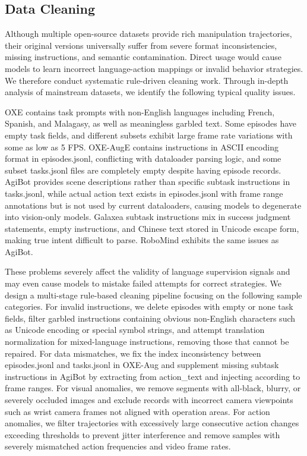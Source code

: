 \documentclass[11pt,a4paper]{article}
\begin{document}
\subsection{Data Cleaning}

Although multiple open-source datasets provide rich manipulation trajectories, their original versions universally suffer from severe format inconsistencies, missing instructions, and semantic contamination. Direct usage would cause models to learn incorrect language-action mappings or invalid behavior strategies. We therefore conduct systematic rule-driven cleaning work. Through in-depth analysis of mainstream datasets, we identify the following typical quality issues.

OXE contains task prompts with non-English languages including French, Spanish, and Malagasy, as well as meaningless garbled text. Some episodes have empty task fields, and different subsets exhibit large frame rate variations with some as low as 5 FPS. OXE-AugE contains instructions in ASCII encoding format in episodes.jsonl, conflicting with dataloader parsing logic, and some subset tasks.jsonl files are completely empty despite having episode records. AgiBot provides scene descriptions rather than specific subtask instructions in tasks.jsonl, while actual action text exists in episodes.jsonl with frame range annotations but is not used by current dataloaders, causing models to degenerate into vision-only models. Galaxea subtask instructions mix in success judgment statements, empty instructions, and Chinese text stored in Unicode escape form, making true intent difficult to parse. RoboMind exhibits the same issues as AgiBot.

These problems severely affect the validity of language supervision signals and may even cause models to mistake failed attempts for correct strategies. We design a multi-stage rule-based cleaning pipeline focusing on the following sample categories. For invalid instructions, we delete episodes with empty or none task fields, filter garbled instructions containing obvious non-English characters such as Unicode encoding or special symbol strings, and attempt translation normalization for mixed-language instructions, removing those that cannot be repaired. For data mismatches, we fix the index inconsistency between episodes.jsonl and tasks.jsonl in OXE-Aug and supplement missing subtask instructions in AgiBot by extracting from action\_text and injecting according to frame ranges. For visual anomalies, we remove segments with all-black, blurry, or severely occluded images and exclude records with incorrect camera viewpoints such as wrist camera frames not aligned with operation areas. For action anomalies, we filter trajectories with excessively large consecutive action changes exceeding thresholds to prevent jitter interference and remove samples with severely mismatched action frequencies and video frame rates.
\end{document}
